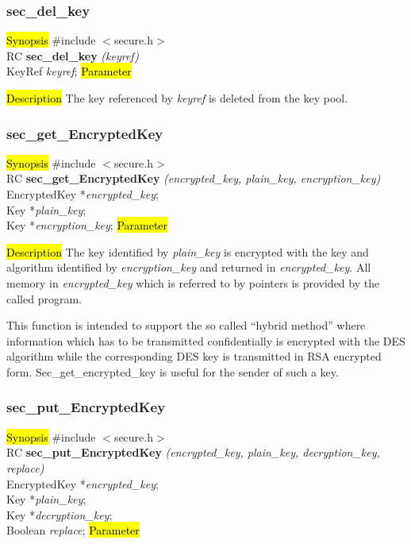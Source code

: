 \subsubsection{sec\_del\_key}
\label{sec_del_key}
\hl{Synopsis}
\#include $<$secure.h$>$ \\ [0.5cm]
RC {\bf sec\_del\_key} {\em (keyref)} \\
KeyRef {\em keyref};
\hl{Parameter}

\hl{Description}
The key referenced by {\em keyref} is deleted from the key pool.

\subsubsection{sec\_get\_EncryptedKey}
\label{sec_get_enc_key}
\hl{Synopsis}
\#include $<$secure.h$>$ \\ [0.5cm]
RC {\bf sec\_get\_EncryptedKey} {\em (encrypted\_key, plain\_key, encryption\_key)} \\
EncryptedKey *{\em encrypted\_key}; \\
Key *{\em plain\_key}; \\
Key *{\em encryption\_key};
\hl{Parameter}



\hl{Description}
The key identified by {\em plain\_key} is encrypted with the key and algorithm identified by
{\em encryption\_key} and returned in 
{\em encrypted\_key}. All memory in {\em encrypted\_key} which is referred to by pointers
is provided by the called program. 

This function is intended to support the so called ``hybrid method'' where information which
has to be transmitted confidentially is encrypted with the DES algorithm while the corresponding DES key
is transmitted in RSA encrypted form. Sec\_get\_encrypted\_key is useful for the sender
of such a key.

\subsubsection{sec\_put\_EncryptedKey}
\label{sec_put_decr_key}
\hl{Synopsis}
\#include $<$secure.h$>$ \\ [0.5cm]
RC {\bf sec\_put\_EncryptedKey} {\em (encrypted\_key, plain\_key, decryption\_key, replace)} \\
EncryptedKey *{\em encrypted\_key}; \\
Key *{\em plain\_key}; \\
Key *{\em decryption\_key}; \\
Boolean {\em replace};
\hl{Parameter}


